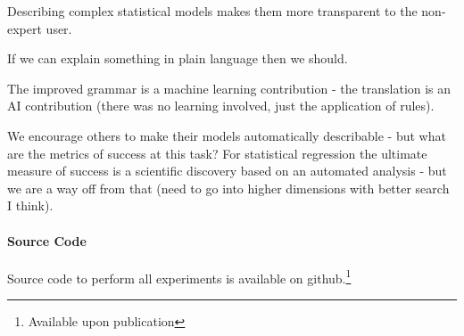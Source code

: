 \documentclass{article}
\begin{document}
Describing complex statistical models makes them more transparent to the non-expert user.

If we can explain something in plain language then we should.

The improved grammar is a machine learning contribution - the translation is an AI contribution (there was no learning involved, just the application of rules).

We encourage others to make their models automatically describable - but what are the metrics of success at this task?
For statistical regression the ultimate measure of success is a scientific discovery based on an automated analysis - but we are a way off from that (need to go into higher dimensions with better search I think).

\paragraph{Source Code}
Source code to perform all experiments is available on github.\footnote{Available upon publication}







\end{document}
